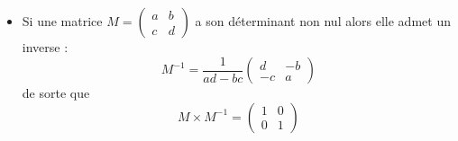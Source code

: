 \documentclass[11pt,class=report,crop=false]{standalone}
\begin{document}
\begin{cours}
\begin{itemize}
  \item Si une matrice $M = \begin{pmatrix}a&b\\c&d\end{pmatrix}$ a son déterminant non nul alors elle admet un inverse :
  $$M^{-1} = \frac{1}{ad-bc} \begin{pmatrix}d&-b\\-c&a\end{pmatrix}$$
  de sorte que 
  $$M \times M^{-1} = \begin{pmatrix}1&0\\0&1\end{pmatrix}$$  
\end{itemize}
\end{cours}



\end{document}
